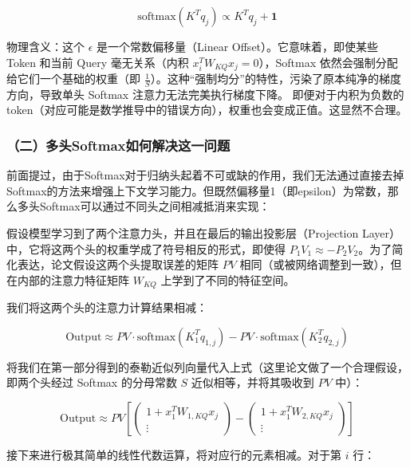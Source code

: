 \[
\mathrm{softmax}(K^Tq_j) \propto K^Tq_j+\mathbf{1}
\]

物理含义：这个 \(\epsilon\) 是一个常数偏移量（Linear Offset）。它意味着，即使某些 Token 和当前 Query 毫无关系（内积 \(x_i^TW_{KQ}x_j=0\)），Softmax 依然会强制分配给它们一个基础的权重（即 \(\frac{1}{S}\)）。这种``强制均分''的特性，污染了原本纯净的梯度方向，导致单头 Softmax 注意力无法完美执行梯度下降。
即便对于内积为负数的token（对应可能是数学推导中的错误方向），权重也会变成正值。这显然不合理。

\hypertarget{ux4e8cux591aux5934softmaxux5982ux4f55ux89e3ux51b3ux8fd9ux4e00ux95eeux9898}{%
\subsubsection{（二）多头Softmax如何解决这一问题}\label{ux4e8cux591aux5934softmaxux5982ux4f55ux89e3ux51b3ux8fd9ux4e00ux95eeux9898}}

前面提过，由于Softmax对于归纳头起着不可或缺的作用，我们无法通过直接去掉Softmax的方法来增强上下文学习能力。但既然偏移量1（即epsilon）为常数，那么多头Softmax可以通过不同头之间相减抵消来实现：

假设模型学习到了两个注意力头，并且在最后的输出投影层（Projection Layer）中，它将这两个头的权重学成了符号相反的形式，即使得 \(P_1V_1 \approx -P_2V_2\)。为了简化表达，论文假设这两个头提取误差的矩阵 \(PV\) 相同（或被网络调整到一致），但在内部的注意力特征矩阵 \(W_{KQ}\) 上学到了不同的特征空间。

我们将这两个头的注意力计算结果相减：

\[
\mathrm{Output} \approx PV \cdot \mathrm{softmax}(K_1^Tq_{1,j}) - PV \cdot \mathrm{softmax}(K_2^Tq_{2,j})
\]

将我们在第一部分得到的泰勒近似列向量代入上式（这里论文做了一个合理假设，即两个头经过 Softmax 的分母常数 \(S\) 近似相等，并将其吸收到 \(PV\) 中）：

\[
\mathrm{Output} \approx PV \left[
\begin{pmatrix}
1+x_1^TW_{1,KQ}x_j \\
\vdots
\end{pmatrix} - \begin{pmatrix}
1+x_1^TW_{2,KQ}x_j \\
\vdots
\end{pmatrix}
\right]
\]

接下来进行极其简单的线性代数运算，将对应行的元素相减。对于第 \(i\) 行：

